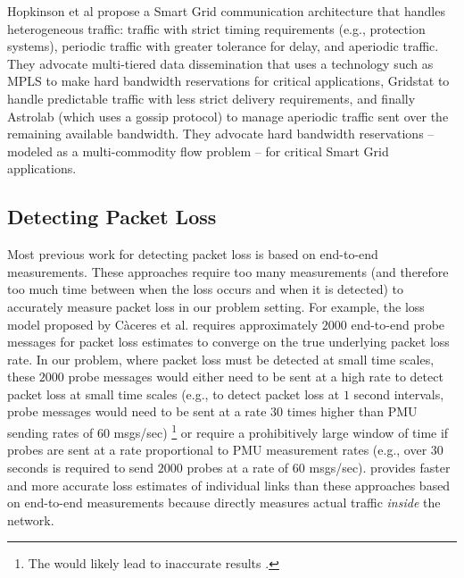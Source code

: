 Hopkinson et al \cite{Hopkinson09} propose a Smart Grid communication architecture that handles heterogeneous traffic: traffic with strict timing requirements (e.g., protection systems), 
periodic traffic with greater tolerance for delay, and aperiodic traffic. They advocate multi-tiered data dissemination that uses a technology such as MPLS to make hard
bandwidth reservations for critical applications, Gridstat to handle predictable traffic with less strict delivery requirements, and finally Astrolab (which uses a gossip protocol) 
to manage aperiodic traffic sent over the remaining available bandwidth. They advocate hard bandwidth reservations -- modeled as a multi-commodity flow problem -- for critical Smart
Grid applications.



\subsection{Detecting Packet Loss}
\label{subsec:related-detection}

Most previous work for detecting packet loss \cite{Almes99,Caceres99} is based on end-to-end measurements.  These approaches require too many measurements (and therefore too much time 
between when the loss occurs and when it is detected) to accurately
measure packet loss in our problem setting. For example, the loss model proposed by C\`{a}ceres et al. \cite{Caceres99} requires approximately $2000$ end-to-end probe messages for 
packet loss estimates to converge on the true underlying packet loss rate.  In our problem, where packet loss must be detected at small time scales, these $2000$ probe messages 
would either need to be sent at a high rate to detect packet loss at small time scales (e.g., to detect packet loss at $1$ second intervals, probe messages would need to be sent at a rate 
$30$ times higher than PMU sending rates of $60$ msgs/sec) \footnote{The would likely lead to inaccurate results \cite{Barford04}.}
or require a prohibitively large window of time if probes are sent at a rate proportional to PMU measurement rates
(e.g., over $30$ seconds is required to send $2000$ probes at a rate of $60$ msgs/sec).   
\pcnt provides faster and more accurate loss estimates of individual links than these approaches based on end-to-end measurements 
because \pcnt directly measures actual traffic \emph{inside} the network.


